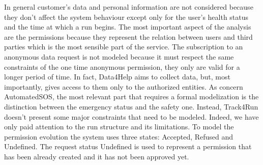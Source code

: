 \documentclass[a4paper]{article}
\begin{document}
In general customer's data and personal information are not considered because they don't affect the system behaviour except only for the user's health status and the time at which a run begins. \newline 
The most important aspect of the analysis are the permissions because they represent the relation between users and third parties which is the most sensible part of the service. The subscription to an anonymous data request is not modeled because it must respect the same constraints of the one time anonymous permission, they only are valid for a longer period of time. \newline 
In fact, Data4Help aims to collect data, but, most importantly, gives access to them only to the authorized entities. \newline
As concern AutomatedSOS, the most relevant part that requires a formal modelization is the distinction between the emergency status and the safety one. \newline
Instead, Track4Run doesn't present some major constraints that need to be modeled. Indeed, we have only paid attention to the run structure and its limitations. \newline 
To model the permission evolution the system uses three states: Accepted, Refused and Undefined. \newline
The request status Undefined is used to represent a permission that has been already created and it has not been approved yet. 


\clearpage
\end{document}
